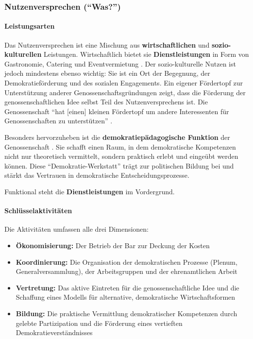 \subsubsection{Nutzenversprechen (\enquote{Was?})}

\paragraph{Leistungsarten}
Das Nutzenversprechen ist eine Mischung aus \textbf{wirtschaftlichen} und \textbf{sozio-kulturellen} Leistungen. Wirtschaftlich bietet sie \textbf{Dienstleistungen} in Form von Gastronomie, Catering und Eventvermietung \parencite{SatzungTRINKGENOSSE2019}. Der sozio-kulturelle Nutzen ist jedoch mindestens ebenso wichtig: Sie ist ein Ort der Begegnung, der Demokratieförderung und des sozialen Engagements. Ein eigener Fördertopf zur Unterstützung anderer Genossenschaftsgründungen zeigt, dass die Förderung der genossenschaftlichen Idee selbst Teil des Nutzenversprechens ist. Die Genossenschaft \enquote{hat [einen] kleinen Fördertopf um andere Interessenten für Genossenschaften zu unterstützen} \parencite{mederInterviewZurGeschaftsmodellanalyse2025}.

Besonders hervorzuheben ist die \textbf{demokratiepädagogische Funktion} der Genossenschaft \parencite{contrasteTrinkGenosseOfenhorn2022}. Sie schafft einen Raum, in dem demokratische Kompetenzen nicht nur theoretisch vermittelt, sondern praktisch erlebt und eingeübt werden können. Diese \enquote{Demokratie-Werkstatt} trägt zur politischen Bildung bei und stärkt das Vertrauen in demokratische Entscheidungsprozesse.

Funktional steht die \textbf{Dienstleistungen} im Vordergrund.

\paragraph{Schlüsselaktivitäten}
Die Aktivitäten umfassen alle drei Dimensionen:
\begin{itemize}
\item \textbf{Ökonomisierung:} Der Betrieb der Bar zur Deckung der Kosten
\item \textbf{Koordinierung:} Die Organisation der demokratischen Prozesse (Plenum, Generalversammlung), der Arbeitsgruppen und der ehrenamtlichen Arbeit \parencite{SatzungTRINKGENOSSE2019}
\item \textbf{Vertretung:} Das aktive Eintreten für die genossenschaftliche Idee und die Schaffung eines Modells für alternative, demokratische Wirtschaftsformen
\item \textbf{Bildung:} Die praktische Vermittlung demokratischer Kompetenzen durch gelebte Partizipation und die Förderung eines vertieften Demokratieverständnisses \parencite{contrasteTrinkGenosseOfenhorn2022}
\end{itemize}

